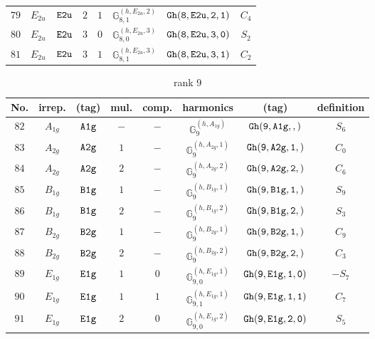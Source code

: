\documentclass[fleqn,8pt]{jsarticle}
\begin{document}
\begin{table}[ht!]
\begin{center}
\begin{tabular}{cccccccc}
$ 79 $ & $ E_{2u} $ & $ {\tt E2u} $ & $ 2 $ & $ 1 $ & $ \mathbb{G}_{8,1}^{(h,E_{2u},2)} $ & $ {\tt Gh(8,E2u,2,1)} $ & $ C_{4} $ \\
$ 80 $ & $ E_{2u} $ & $ {\tt E2u} $ & $ 3 $ & $ 0 $ & $ \mathbb{G}_{8,0}^{(h,E_{2u},3)} $ & $ {\tt Gh(8,E2u,3,0)} $ & $ S_{2} $ \\
$ 81 $ & $ E_{2u} $ & $ {\tt E2u} $ & $ 3 $ & $ 1 $ & $ \mathbb{G}_{8,1}^{(h,E_{2u},3)} $ & $ {\tt Gh(8,E2u,3,1)} $ & $ C_{2} $ \\
 \hline \hline
\end{tabular}
\end{center}
\end{table}
\begin{table}[ht!]
\begin{center}
\caption{rank 9}
\renewcommand{\arraystretch}{1.3}
\begin{tabular}{cccccccc} \hline \hline
No. & irrep. & (tag) & mul. & comp. & harmonics & (tag) & definition \\ \hline
$ 82 $ & $ A_{1g} $ & $ {\tt A1g} $ & $ - $ & $ - $ & $ \mathbb{G}_{9}^{(h,A_{1g})} $ & $ {\tt Gh(9,A1g,,)} $ & $ S_{6} $ \\
$ 83 $ & $ A_{2g} $ & $ {\tt A2g} $ & $ 1 $ & $ - $ & $ \mathbb{G}_{9}^{(h,A_{2g},1)} $ & $ {\tt Gh(9,A2g,1,)} $ & $ C_{0} $ \\
$ 84 $ & $ A_{2g} $ & $ {\tt A2g} $ & $ 2 $ & $ - $ & $ \mathbb{G}_{9}^{(h,A_{2g},2)} $ & $ {\tt Gh(9,A2g,2,)} $ & $ C_{6} $ \\
$ 85 $ & $ B_{1g} $ & $ {\tt B1g} $ & $ 1 $ & $ - $ & $ \mathbb{G}_{9}^{(h,B_{1g},1)} $ & $ {\tt Gh(9,B1g,1,)} $ & $ S_{9} $ \\
$ 86 $ & $ B_{1g} $ & $ {\tt B1g} $ & $ 2 $ & $ - $ & $ \mathbb{G}_{9}^{(h,B_{1g},2)} $ & $ {\tt Gh(9,B1g,2,)} $ & $ S_{3} $ \\
$ 87 $ & $ B_{2g} $ & $ {\tt B2g} $ & $ 1 $ & $ - $ & $ \mathbb{G}_{9}^{(h,B_{2g},1)} $ & $ {\tt Gh(9,B2g,1,)} $ & $ C_{9} $ \\
$ 88 $ & $ B_{2g} $ & $ {\tt B2g} $ & $ 2 $ & $ - $ & $ \mathbb{G}_{9}^{(h,B_{2g},2)} $ & $ {\tt Gh(9,B2g,2,)} $ & $ C_{3} $ \\
$ 89 $ & $ E_{1g} $ & $ {\tt E1g} $ & $ 1 $ & $ 0 $ & $ \mathbb{G}_{9,0}^{(h,E_{1g},1)} $ & $ {\tt Gh(9,E1g,1,0)} $ & $ - S_{7} $ \\
$ 90 $ & $ E_{1g} $ & $ {\tt E1g} $ & $ 1 $ & $ 1 $ & $ \mathbb{G}_{9,1}^{(h,E_{1g},1)} $ & $ {\tt Gh(9,E1g,1,1)} $ & $ C_{7} $ \\
$ 91 $ & $ E_{1g} $ & $ {\tt E1g} $ & $ 2 $ & $ 0 $ & $ \mathbb{G}_{9,0}^{(h,E_{1g},2)} $ & $ {\tt Gh(9,E1g,2,0)} $ & $ S_{5} $ \\

\end{tabular}
\end{center}
\end{table}
\end{document}
